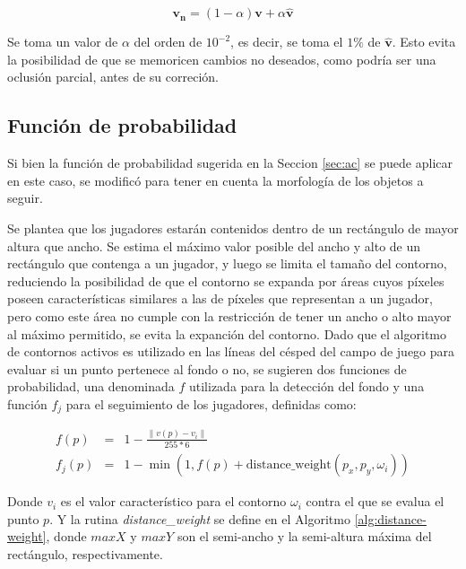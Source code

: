 \[
  \mathbf{v_n} = \left(1-\alpha\right)\mathbf{v} + \alpha \hat{\mathbf{v}}
\]

Se toma un valor de $\alpha$ del orden de $10^{-2}$, es decir, se toma el $1\%$
de $\hat{\mathbf{v}}$. Esto evita la posibilidad de que se memoricen cambios
no deseados, como podría ser una oclusión parcial, antes de su correción.

\subsection{Función de probabilidad}

Si bien la función de probabilidad sugerida en la Seccion \ref{sec:ac} se puede
aplicar en este caso, se modificó para tener en cuenta la morfología de los objetos
a seguir.

Se plantea que los jugadores estarán contenidos dentro de un rectángulo de
mayor altura que ancho. Se estima el máximo valor posible del ancho y alto de
un rectángulo que contenga a un jugador, y luego se limita el tamaño del
contorno, reduciendo la posibilidad de que el contorno se expanda por áreas
cuyos píxeles poseen características similares a las de píxeles que representan
a un jugador, pero como este área no cumple con la restricción de tener un
ancho o alto mayor al máximo permitido, se evita la expanción del contorno.
Dado que el algoritmo de contornos activos es utilizado en las líneas del
césped del campo de juego para evaluar si un punto pertenece al fondo o no, se
sugieren dos funciones de probabilidad, una denominada $f$ utilizada para la
detección del fondo y una función $f_j$ para el seguimiento de los jugadores,
definidas como:

\begin{eqnarray*}
    f(p) &=& 1 - \frac{\| v(p) - v_i \|}{255 * 6} \\
    f_j(p) &=& 1 - \min(1, f(p) + \text{distance\_weight}(p_x, p_y, \omega_i))
\end{eqnarray*}

Donde $v_i$ es el valor característico para el contorno $\omega_i$ contra el
que se evalua el punto $p$. Y la rutina \textit{distance\_weight} se define en
el Algoritmo \ref{alg:distance-weight}, donde $maxX$ y $maxY$ son el semi-ancho
y la semi-altura máxima del rectángulo, respectivamente.

